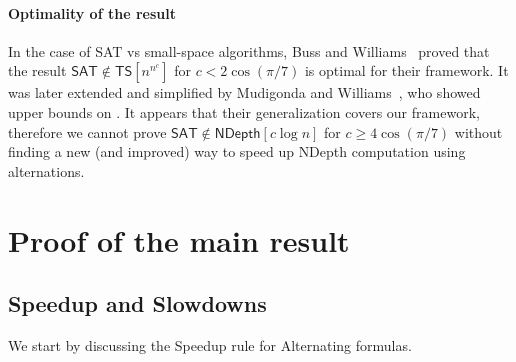 \documentclass[a4paper, 11pt]{article}
\theoremstyle{plain}
\theoremstyle{definition}
\theoremstyle{remark}
\newcommand{\SAT}{\textsf{SAT}}%
\newcommand{\ND}{\textsf{NDepth}}%
\newcommand{\NDL}[1]{\ND\left[ #1 \log n\right]}%
\newcommand{\TS}[1]{\textsf{TS}\left[ n^{ #1 }\right]}%
\begin{document}
\paragraph{Optimality of the result}
In the case of \SAT{} vs small-space algorithms, 
Buss and Williams~\cite{buss2015limits} proved that the result $\SAT\notin \TS{n^c}$
for $c < 2\cos(\pi/7)$ is optimal for their framework. 
It was later extended and simplified by Mudigonda and Williams~\cite{mudigonda2020time},
who showed upper bounds on .
It appears that their generalization covers our framework,
therefore we cannot prove $\SAT\notin\NDL{c}$ for $c \ge 4\cos(\pi/7)$
without finding a new (and improved) way to speed up \ND{} computation using alternations.

\section{Proof of the main result}

\subsection{Speedup and Slowdowns}\label{sec:rules}
We start by discussing the Speedup rule for Alternating formulas.
\end{document}
